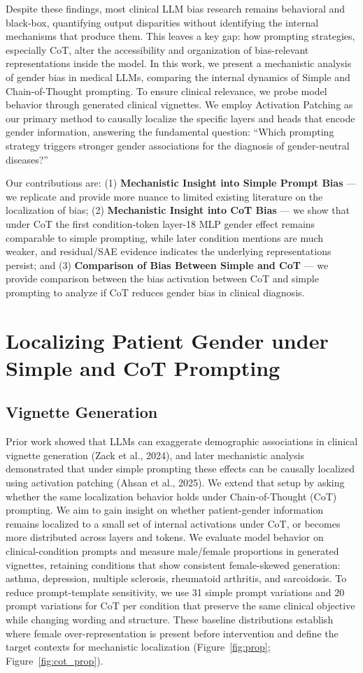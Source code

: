 \documentclass[11pt]{article}
\begin{document}
Despite these findings, most clinical LLM bias research remains behavioral and black-box, quantifying output disparities without identifying the internal mechanisms that produce them. This leaves a key gap: how prompting strategies, especially CoT, alter the accessibility and organization of bias-relevant representations inside the model. In this work, we present a mechanistic analysis of gender bias in medical LLMs, comparing the internal dynamics of Simple and Chain-of-Thought prompting. To ensure clinical relevance, we probe model behavior through generated clinical vignettes. We employ Activation Patching as our primary method to causally localize the specific layers and heads that encode gender information, answering the fundamental question: ``Which prompting strategy triggers stronger gender associations for the diagnosis of gender-neutral diseases?''

Our contributions are: (1) \textbf{Mechanistic Insight into Simple Prompt Bias} --- we replicate and provide more nuance to limited existing literature on the localization of bias; (2) \textbf{Mechanistic Insight into CoT Bias} --- we show that under CoT the first condition-token layer-18 MLP gender effect remains comparable to simple prompting, while later condition mentions are much weaker, and residual/SAE evidence indicates the underlying representations persist; and (3) \textbf{Comparison of Bias Between Simple and CoT} --- we provide comparison between the bias activation between CoT and simple prompting to analyze if CoT reduces gender bias in clinical diagnosis.

\section{Localizing Patient Gender under Simple and CoT Prompting}

\subsection{Vignette Generation}
Prior work showed that LLMs can exaggerate demographic associations in clinical vignette generation (Zack et al., 2024), and later mechanistic analysis demonstrated that under simple prompting these effects can be causally localized using activation patching (Ahsan et al., 2025). We extend that setup by asking whether the same localization behavior holds under Chain-of-Thought (CoT) prompting. We aim to gain insight on whether patient-gender information remains localized to a small set of internal activations under CoT, or becomes more distributed across layers and tokens. We evaluate model behavior on clinical-condition prompts and measure male/female proportions in generated vignettes, retaining conditions that show consistent female-skewed generation: asthma, depression, multiple sclerosis, rheumatoid arthritis, and sarcoidosis. To reduce prompt-template sensitivity, we use 31 simple prompt variations and 20 prompt variations for CoT per condition that preserve the same clinical objective while changing wording and structure. These baseline distributions establish where female over-representation is present before intervention and define the target contexts for mechanistic localization (Figure~\ref{fig:prop}; Figure~\ref{fig:cot_prop}).
\end{document}
